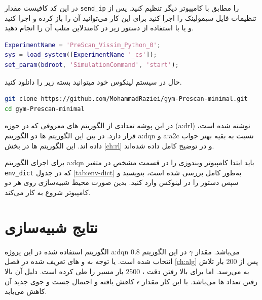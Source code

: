 در این کد کافیست مقدار \texttt{send\_ip} را مطابق با  کامپیوتر دیگر تنظیم کنید. پس از تنظیمات فایل سیمولینک را اجرا کنید برای این کار می‌توانید آن را باز کرده و اجرا کنید و یا با استفاده از دستور زیر در کامندلاین متلب آن را انجام دهید.
\begin{latin}
\begin{lstlisting}[language=matlab]
ExperimentName = 'PreScan_Vissim_Python_0';
sys = load_system([ExperimentName '_cs']);
set_param(bdroot, 'SimulationCommand', 'start');
\end{lstlisting}
\end{latin}

حال در سیستم لینکوس خود میتوانید بسته زیر را دانلود کنید.

\begin{latin}
\begin{lstlisting}[language=bash]
git clone https://github.com/MohammadRaziei/gym-Prescan-minimal.git
cd gym-Prescan-minimal
\end{lstlisting}
\end{latin}

در این پوشه تعدادی از الگوریتم های معروفی که در حوزه (\gls{a:drl}) نوشته شده است، قرار دارد.
در بین این الگوریتم ها دو الگوریتم \gls{a:dqn} و \gls{a:a2c} نسبت به بقیه بهتر جواب داده اند. این الگوریتم ها در بخش 
\ref{ch:rl}
و در 
\cite{stable-baselines}
توضیح کامل داده شده‌اند.

برای اجرای الگوریتم \gls{a:dqn} باید ابتدا  کامپیوتر ویندوزی را در قسمت مشخص در متغیر \texttt{env\_dict} که در جدول \ref{tab:env-dict} به‌طور کامل بررسی شده است، بنویسید و سپس دستور  را در  لینوکس وارد کنید. بدین صورت محیط شبیه‌سازی روی هر دو کامپیوتر شروع به کار می‌کند.



\section{نتایج شبیه‌سازی}

الگوریتم استفاده شده در این پروژه \gls{a:dqn} می‌باشد. مقدار $\gamma$ در این الگوریتم $0.8$ انتخاب شده است. یا توجه به  و   های تعریف شده در فصل \ref{ch:alg} پس از 200 بار تلاش به  می‌رسد.
اما برای بالا رفتن دقت ، 2500 بار  مسیر را طی کرده است. دلیل آن بالا رفتن تعداد ها می‌باشد. با این کار مقدار $\epsilon$ کاهش یافته و احتمال جست و جوی  جدید آن کاهش می‌یابد.



